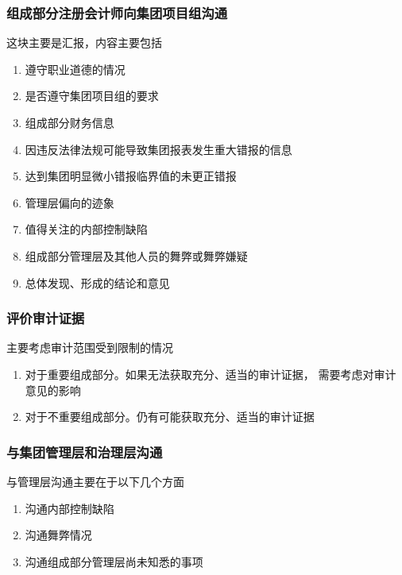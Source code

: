 \documentclass[UTF8,12pt]{ctexart}
\numberwithin{equation}{section} %
\numberwithin{figure}{section}
\numberwithin{table}{section}
\begin{document}
	
	\subsubsection{组成部分注册会计师向集团项目组沟通}
	这块主要是汇报，内容主要包括
	\begin{enumerate}
		\item 遵守职业道德的情况
		
		\item 是否遵守集团项目组的要求
		
		\item 组成部分财务信息
		
		\item 因违反法律法规可能导致集团报表发生重大错报的信息
		
		\item 达到集团明显微小错报临界值的未更正错报
		
		\item 管理层偏向的迹象
		
		\item 值得关注的内部控制缺陷
		
		\item 组成部分管理层及其他人员的舞弊或舞弊嫌疑
		
		\item 总体发现、形成的结论和意见
	\end{enumerate}
	
	\subsubsection{评价审计证据}
	主要考虑审计范围受到限制的情况
	\begin{enumerate}
		\item 对于重要组成部分。如果无法获取充分、适当的审计证据， 需要考虑对审计意见的影响
		
		\item 对于不重要组成部分。仍有可能获取充分、适当的审计证据
	\end{enumerate}
	
	\subsubsection{与集团管理层和治理层沟通}
	与管理层沟通主要在于以下几个方面
	\begin{enumerate}
		\item 沟通内部控制缺陷
		
		\item 沟通舞弊情况
		
		\item 沟通组成部分管理层尚未知悉的事项
	\end{enumerate}
	
\end{document}
